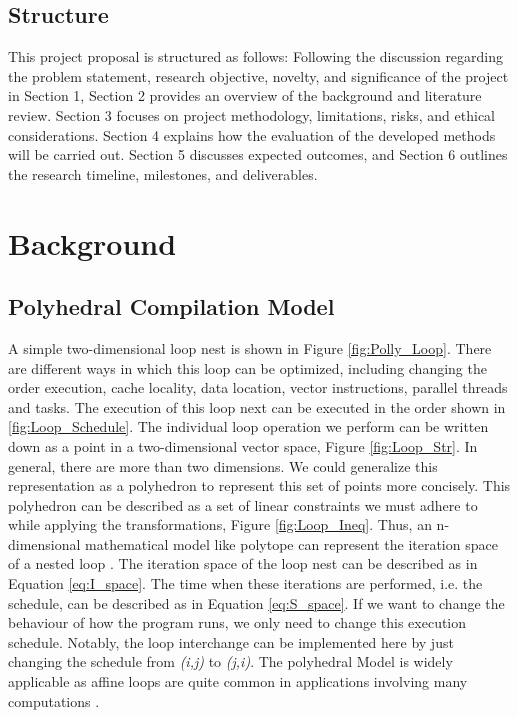 \documentclass[logo,msc]{infthesis}           %
\begin{document}
\section{Structure}

This project proposal is structured as follows: Following the discussion regarding the problem statement, research objective, novelty, and significance of the project in Section 1, Section 2 provides an overview of the background and literature review. Section 3 focuses on project methodology, limitations, risks, and ethical considerations. Section 4 explains how the evaluation of the developed methods will be carried out. Section 5 discusses expected outcomes, and Section 6 outlines the research timeline, milestones, and deliverables.

\chapter{Background}

\section{Polyhedral Compilation Model}

 A simple two-dimensional loop nest is shown in Figure \ref{fig:Polly_Loop}. There are different ways in which this loop can be optimized, including changing the order execution, cache locality, data location, vector instructions, parallel threads and tasks. The execution of this loop next can be executed in the order shown in \ref{fig:Loop_Schedule}. The individual loop operation we perform can be written down as a point in a two-dimensional vector space, Figure \ref{fig:Loop_Str}. In general, there are more than two dimensions. We could generalize this representation as a polyhedron to represent this set of points more concisely. This polyhedron can be described as a set of linear constraints we must adhere to while applying the transformations, Figure \ref{fig:Loop_Ineq}. Thus, an n-dimensional mathematical model like polytope can represent the iteration space of a nested loop \cite{P3}. The iteration space of the loop nest can be described as in Equation \ref{eq:I_space}. The time when these iterations are performed, i.e. the schedule, can be described as in Equation \ref{eq:S_space}. If we want to change the behaviour of how the program runs, we only need to change this execution schedule. Notably, the loop interchange can be implemented here by just changing the schedule from \textit{(i,j)} to \textit{(j,i)}. The polyhedral Model is widely applicable as affine loops are quite common in applications involving many computations \cite{poly_applicable}.
\end{document}
